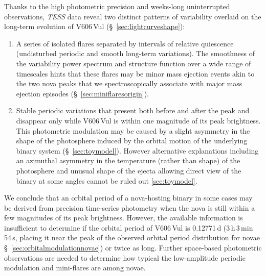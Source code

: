 \documentclass[twocolumn]{aastex631}
\newcommand{\nova}{V606\,Vul}
\begin{document}
Thanks to the high photometric precision and weeks-long uninterrupted
observations, {\em TESS} data reveal two distinct patterns of variability
overlaid on the long-term evolution of \nova{} (\S~\ref{sec:lightcurveshape}): 
\begin{enumerate}
\item A series of isolated flares separated by intervals of relative quiescence 
(undisturbed periodic and smooth long-term variations). 
The smoothness of the variability power spectrum and structure function over
a wide range of timescales hints that these flares may be minor mass ejection 
events akin to the two nova peaks that we spectroscopically associate with 
major mass ejection episodes (\S~\ref{sec:miniflaresorigin}).
\item Stable periodic variations that present both before and after the peak and
disappear only while \nova{} is within one magnitude of its peak brightness.
This photometric modulation may be caused by a slight asymmetry in the shape of 
the photosphere induced by the orbital motion of the underlying binary system
(\S~\ref{sec:toymodel}). However alternative explanations including an
azimuthal asymmetry in the temperature (rather than shape) of the
photosphere and unusual shape of the ejecta allowing direct view of the
binary at some angles cannot be ruled out \ref{sec:toymodel}.
\end{enumerate}

We conclude that an orbital period of a nova-hosting binary in some cases may be derived
from precision time-series photometry when the nova is still within a few
magnitudes of its peak brightness.
%
However, the available information is insufficient to determine if the
orbital period of \nova{} is 0.12771\,d (3\,h\,3\,min\,54\,s, placing it
near the peak of the observed orbital period distribution for novae \S~\ref{sec:orbitalmodulationnovae}) or twice as long.
%
Further space-based photometric observations are needed to determine how typical
the low-amplitude periodic modulation and mini-flares are among novae. 
\end{document}
